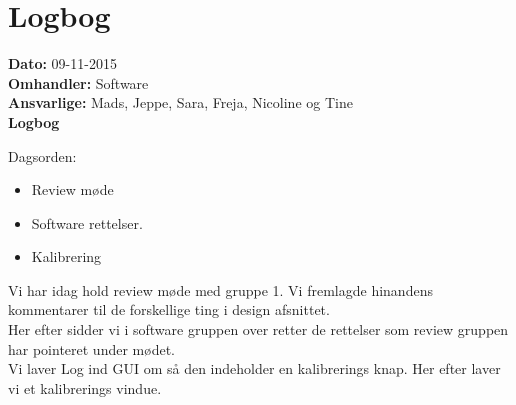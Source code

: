 
\section{Logbog}

\textbf{Dato:} 09-11-2015 \\
\textbf{Omhandler:} Software \\
\textbf{Ansvarlige:} Mads, Jeppe, Sara, Freja, Nicoline og Tine \\
\textbf{Logbog}

Dagsorden:
\begin{itemize}
	\item Review møde
	\item Software rettelser.
	\item Kalibrering
\end{itemize}

Vi har idag hold review møde med gruppe 1. Vi fremlagde hinandens kommentarer til de forskellige ting i design afsnittet.\\
Her efter sidder vi i software gruppen over retter de rettelser som review gruppen har pointeret under mødet.\\
Vi laver Log ind GUI om så den indeholder en kalibrerings knap. Her efter laver vi et kalibrerings vindue. 
   
